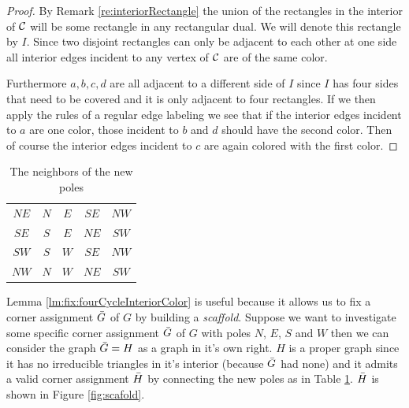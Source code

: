   \begin{proof}
  By Remark \ref{re:interiorRectangle} the union of the rectangles in the interior of $\mathcal{C}$ will be some rectangle in any rectangular dual. We will denote this rectangle by $I$. Since two disjoint rectangles can only be adjacent to each other at one side all interior edges incident to any vertex of $\mathcal{C}$ are of the same color.

  Furthermore $a, b, c, d$ are all adjacent to a different side of $I$ since $I$ has four sides that need to be covered and it is only adjacent to four rectangles. If we then apply the rules of a regular edge labeling we see that if the interior edges incident to $a$ are one color, those incident to $b$ and $d$ should have the second color. Then of course the interior edges incident to $c$ are again colored with the first color.

  \end{proof}


  \begin{table}
    \centering
    \begin{tabular}{c|| c c c c}
      $NE$ & $N$ & $ E$ & $ SE$ & $ NW$ \\
      $SE$ & $S$ & $ E$ & $ NE$ & $ SW$\\
      $SW$ & $S$ & $ W$ & $ SE$ & $ NW$\\
      $NW$ & $N$ & $ W$ & $ NE$ & $ SW$\\
    \end{tabular}
    \caption{The neighbors of the new poles}
    \label{tab:scaffold}
  \end{table}

  Lemma \ref{lm:fix:fourCycleInteriorColor} is useful because it allows us to fix a corner assignment $\bar{G}$ of $G$ by building a \emph{scaffold}. Suppose we want to investigate some specific corner assignment $\bar{G}$ of $G$ with poles $N$, $E$, $S$ and $W$ then we can consider the graph $\bar{G} = H$ as a graph in it's own right. $H$ is a proper graph since it has no irreducible triangles in it's interior (because $\bar{G}$ had none) and it admits a valid corner assignment $\bar{H}$ by connecting the new poles as in Table \ref{tab:scaffold}. $\bar{H}$ is shown in Figure \ref{fig:scafold}.

